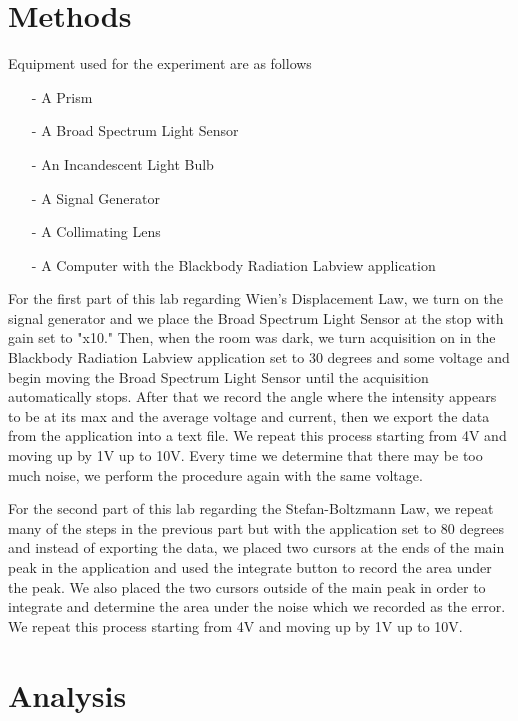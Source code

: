 \documentclass{article}
\begin{document}
\section{Methods}
Equipment used for the experiment are as follows
\begin{itemize}
    \item[-] A Prism
    \item[-] A Broad Spectrum Light Sensor
    \item[-] An Incandescent Light Bulb
    \item[-] A Signal Generator
    \item[-] A Collimating Lens
    \item[-] A Computer with the Blackbody Radiation Labview application
\end{itemize}
For the first part of this lab regarding Wien's Displacement Law, we turn on the 
signal generator and we place the Broad Spectrum Light Sensor at the stop with gain 
set to "x10."  Then, when the room was dark, we turn acquisition on in the Blackbody
Radiation Labview application set to 30 degrees and some voltage and begin moving 
the Broad Spectrum Light Sensor until the acquisition automatically stops.  After that
we record the angle where the intensity appears to be at its max and the average voltage 
and current, then we export the data from the application into a text file.  We repeat 
this process starting from 4V and moving up by 1V up to 10V.  Every time we 
determine that there may be too much noise, we perform the procedure again with the same
voltage.

For the second part of this lab regarding the Stefan-Boltzmann Law, we repeat many of the 
steps in the previous part but with the application set to 80 degrees and instead of 
exporting the data, we placed two cursors at the ends of the main peak in the application 
and used the integrate button to record the area under the peak.  We also placed the two 
cursors outside of the main peak in order to integrate and determine the area under the 
noise which we recorded as the error.  We repeat this process starting from 4V and moving 
up by 1V up to 10V.

\newpage

\section{Analysis}
\end{document}
